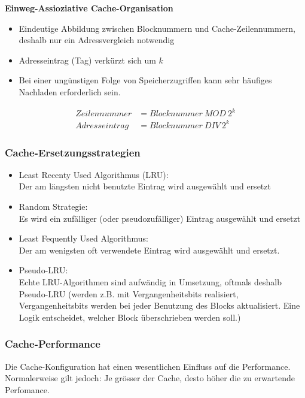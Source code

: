 	\textbf{Einweg-Assioziative Cache-Organisation}
	\begin{itemize}[noitemsep,topsep=0pt]
		\item Eindeutige Abbildung zwischen Blocknummern und Cache-Zeilennummern, deshalb nur ein Adressvergleich notwendig
		\item Adresseintrag (Tag) verkürzt sich um $k$
		\item Bei einer ungünstigen Folge von Speicherzugriffen kann sehr häufiges Nachladen erforderlich sein.
	\end{itemize}
	\begin{align*}
		Zeilennummer &= Blocknummer \ MOD \ 2^k\\
		Adresseintrag &= Blocknummer \ DIV \ 2^k
	\end{align*}


\subsubsection{Cache-Ersetzungsstrategien}
	\begin{itemize}[noitemsep,topsep=0pt]
		\item Least Recenty Used Algorithmus (LRU):\\
		Der am längsten nicht benutzte Eintrag wird ausgewählt und ersetzt
		\item Random Strategie:\\
		Es wird ein zufälliger (oder pseudozufälliger) Eintrag ausgewählt und ersetzt
		\item Least Fequently Used Algorithmus:\\
		Der am wenigsten oft verwendete Eintrag wird ausgewählt und ersetzt.
		\item Pseudo-LRU:\\
		Echte LRU-Algorithmen sind aufwändig in Umsetzung, oftmals deshalb Pseudo-LRU (werden z.B. mit Vergangenheitsbits realisiert, Vergangenheitsbits werden bei jeder Benutzung des Blocks aktualisiert.
		Eine Logik entscheidet, welcher Block überschrieben werden soll.)
	\end{itemize}
	
	\subsubsection{Cache-Performance}
Die Cache-Konfiguration hat einen wesentlichen Einfluss auf die Performance.
Normalerweise gilt jedoch: Je grösser der Cache, desto höher die zu erwartende Perfomance.


